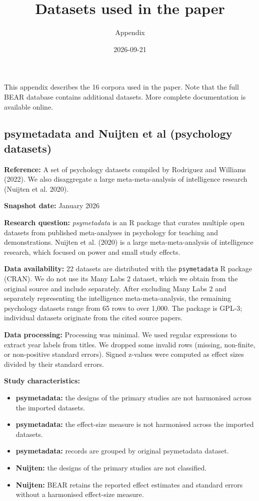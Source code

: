 \documentclass[
  11pt,
]{article}
\title{Datasets used in the paper}
\subtitle{Appendix}
\author{}
\date{\vspace{-2.5em}2026-09-21}
\providecommand{\tightlist}{%
  \setlength{\itemsep}{0pt}\setlength{\parskip}{0pt}}
\begin{document}
\maketitle

This appendix describes the 16 corpora used in the paper. Note that the
full BEAR database contains additional datasets. More complete
documentation is available online.

\newpage

\subsection{psymetadata and Nuijten et al (psychology
datasets)}\label{psymetadata-and-nuijten-et-al-psychology-datasets}

\textbf{Reference:} A set of psychology datasets compiled by Rodriguez
and Williams (2022). We also disaggregate a large meta-meta-analysis of
intelligence research (Nuijten et al. 2020).

\textbf{Snapshot date:} January 2026

\textbf{Research question:} \emph{psymetadata} is an R package that
curates multiple open datasets from published meta-analyses in
psychology for teaching and demonstrations. Nuijten et al. (2020) is a
large meta-meta-analysis of intelligence research, which focused on
power and small study effects.

\textbf{Data availability:} 22 datasets are distributed with the
\texttt{psymetadata} R package (CRAN). We do not use its Many Labs 2
dataset, which we obtain from the original source and include
separately. After excluding Many Labs 2 and separately representing the
intelligence meta-meta-analysis, the remaining psychology datasets range
from 65 rows to over 1,000. The package is GPL-3; individual datasets
originate from the cited source papers.

\textbf{Data processing:} Processing was minimal. We used regular
expressions to extract year labels from titles. We dropped some invalid
rows (missing, non-finite, or non-positive standard errors). Signed
z-values were computed as effect sizes divided by their standard errors.

\textbf{Study characteristics:}

\begin{itemize}
\tightlist
\item
  \textbf{psymetadata:} the designs of the primary studies are not
  harmonised across the imported datasets.
\item
  \textbf{psymetadata:} the effect-size measure is not harmonised across
  the imported datasets.
\item
  \textbf{psymetadata:} records are grouped by original psymetadata
  dataset.
\item
  \textbf{Nuijten:} the designs of the primary studies are not
  classified.
\item
  \textbf{Nuijten:} BEAR retains the reported effect estimates and
  standard errors without a harmonised effect-size measure.
\end{itemize}
\end{document}
